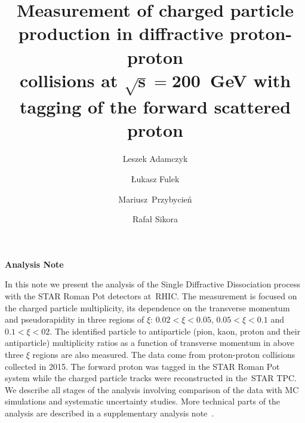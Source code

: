 \documentclass[a4paper,10pt,notitlepage]{report}
\title{\textbf{Measurement of charged particle production in diffractive proton-proton\\ collisions at $\mathbf{\sqrt{s}=200}$~GeV with tagging of the forward scattered proton}\vspace*{10pt}}
\author[1]{Leszek Adamczyk}
\author[1]{Łukasz Fulek}
\author[1]{\mbox{Mariusz Przybycień}}
\author[1]{Rafał Sikora}
\affil[1]{AGH University of Science and Technology, FPACS, Kraków, Poland}
\begin{document}
\makeatletter
\setlength{\@fptop}{0pt}
\makeatother

\begin{center}
	\textbf{\LARGE{Analysis Note}}
	
	\begin{minipage}{\linewidth}
		\maketitle
			In this note we present the analysis of the Single Diffractive Dissociation process with the STAR Roman Pot detectors at~RHIC. The measurement is focused on the charged particle
			multiplicity, its dependence on the transverse momentum  and pseudorapidity   in  three regions of $\xi$: $0.02<\xi <0.05$, $0.05<\xi<0.1$ and $0.1<\xi<02$.  The identified particle to antiparticle (pion, kaon, proton and their antiparticle) multiplicity ratios as a function of transverse momentum in above three $\xi$ regions  are also measured. The data come from proton-proton collisions collected in 2015. The forward proton was tagged in the STAR Roman Pot system while the charged particle tracks were reconstructed in the~STAR \ac{TPC}. 
			We describe all stages of the analysis involving comparison of the data with MC simulations and systematic uncertainty studies.
			More technical parts of the analysis  are described in a supplementary analysis note~\cite{supplementaryNote}.	
		\thispagestyle{empty}
	\end{minipage}

\end{center}


\newpage








\tableofcontents
\setcounter{page}{1}

\newpage
\setcounter{page}{1}







%










\begin{appendices}
	
	
	
\end{appendices}
\end{document}
